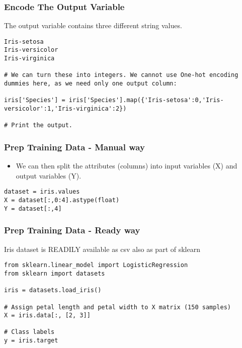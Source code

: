 \begin{frame}[fragile]\frametitle{Encode The Output Variable}
The output variable contains three different string values.
\begin{lstlisting}
Iris-setosa
Iris-versicolor
Iris-virginica

# We can turn these into integers. We cannot use One-hot encoding dummies here, as we need only one output column:

iris['Species'] = iris['Species'].map({'Iris-setosa':0,'Iris-versicolor':1,'Iris-virginica':2})

# Print the output.
\end{lstlisting}



\end{frame}

\begin{frame}[fragile]\frametitle{Prep Training Data - Manual way}
\begin{itemize}
\item We can then split the attributes (columns) into input variables (X) and output variables (Y).
\end{itemize}
\begin{lstlisting}
dataset = iris.values
X = dataset[:,0:4].astype(float)
Y = dataset[:,4]
\end{lstlisting}
\end{frame}


\begin{frame}[fragile]\frametitle{Prep Training Data - Ready way}
Iris dataset is READILY available as csv also as part of sklearn
\begin{lstlisting}
from sklearn.linear_model import LogisticRegression
from sklearn import datasets

iris = datasets.load_iris()

# Assign petal length and petal width to X matrix (150 samples)
X = iris.data[:, [2, 3]]

# Class labels
y = iris.target
\end{lstlisting}

\end{frame}

